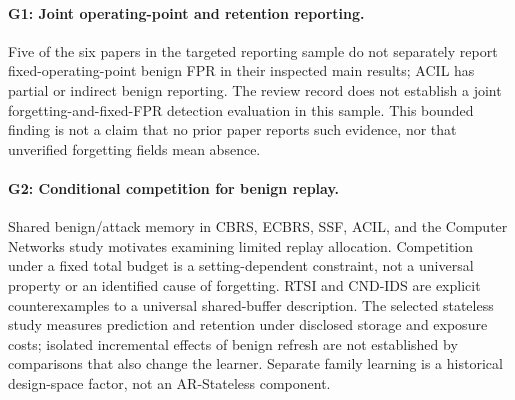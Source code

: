 \documentclass[10pt,twocolumn]{article}
\begin{document}
\paragraph{G1: Joint operating-point and retention reporting.}
Five of the six papers in the targeted reporting sample do not separately report fixed-operating-point benign FPR in their inspected main results; ACIL has partial or indirect benign reporting. The review record does not establish a joint forgetting-and-fixed-FPR detection evaluation in this sample. This bounded finding is not a claim that no prior paper reports such evidence, nor that unverified forgetting fields mean absence.
\paragraph{G2: Conditional competition for benign replay.}
Shared benign/attack memory in CBRS, ECBRS, SSF, ACIL, and the Computer Networks study motivates examining limited replay allocation. Competition under a fixed total budget is a setting-dependent constraint, not a universal property or an identified cause of forgetting. RTSI and CND-IDS are explicit counterexamples to a universal shared-buffer description. The selected stateless study measures prediction and retention under disclosed storage and exposure costs; isolated incremental effects of benign refresh are not established by comparisons that also change the learner. Separate family learning is a historical design-space factor, not an AR-Stateless component.
\end{document}
